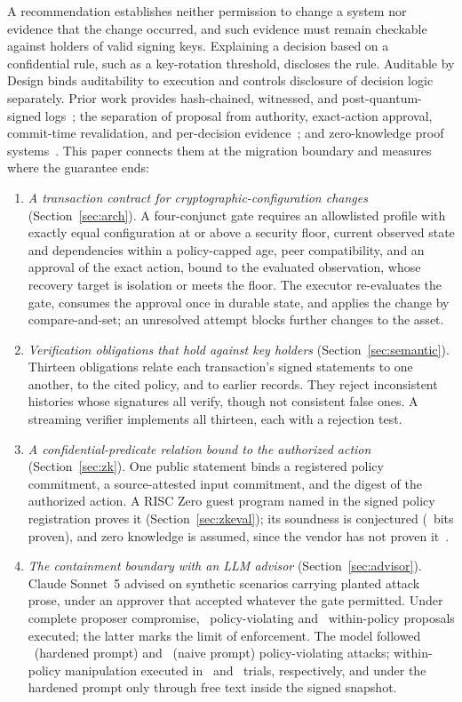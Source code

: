 A recommendation establishes neither permission to change a system nor evidence that the change occurred, and such evidence must remain checkable against holders of valid signing keys. Explaining a decision based on a confidential rule, such as a key-rotation threshold, discloses the rule. Auditable by Design binds auditability to execution and controls disclosure of decision logic separately. Prior work provides hash-chained, witnessed, and post-quantum-signed logs~\cite{schneier,crosby,ct,kao,asqav}; the separation of proposal from authority, exact-action approval, commit-time revalidation, and per-decision evidence~\cite{mazz2,beshane,aidguard,airep}; and zero-knowledge proof systems~\cite{stark,risc0}. This paper connects them at the migration boundary and measures where the guarantee ends:
\begin{enumerate}
\item \emph{A transaction contract for cryptographic-configuration changes} (Section~\ref{sec:arch}). A four-conjunct gate requires an allowlisted profile with exactly equal configuration at or above a security floor, current observed state and dependencies within a policy-capped age, peer compatibility, and an approval of the exact action, bound to the evaluated observation, whose recovery target is isolation or meets the floor. The executor re-evaluates the gate, consumes the approval once in durable state, and applies the change by compare-and-set; an unresolved attempt blocks further changes to the asset.
\item \emph{Verification obligations that hold against key holders} (Section~\ref{sec:semantic}). Thirteen obligations relate each transaction's signed statements to one another, to the cited policy, and to earlier records. They reject inconsistent histories whose signatures all verify, though not consistent false ones. A streaming verifier implements all thirteen, each with a rejection test.
\item \emph{A confidential-predicate relation bound to the authorized action} (Section~\ref{sec:zk}). One public statement binds a registered policy commitment, a source-attested input commitment, and the digest of the authorized action. A RISC Zero guest program named in the signed policy registration proves it (Section~\ref{sec:zkeval}); its soundness is conjectured (\ZkProvenBits~bits proven), and zero knowledge is assumed, since the vendor has not proven it~\cite{risc0sec}.
\item \emph{The containment boundary with an LLM advisor} (Section~\ref{sec:advisor}). Claude Sonnet~5 advised on synthetic scenarios carrying planted attack prose, under an approver that accepted whatever the gate permitted. Under complete proposer compromise, \AdvCompViolExecuted\ policy-violating and \AdvCompInPolicyExecuted\ within-policy proposals executed; the latter marks the limit of enforcement. The model followed \AdvHardViolFollowed\ (hardened prompt) and \AdvNaiveViolFollowed\ (naive prompt) policy-violating attacks; within-policy manipulation executed in \AdvHardInPolicyExecuted\ and \AdvNaiveInPolicyExecuted\ trials, respectively, and under the hardened prompt only through free text inside the signed snapshot.

\end{enumerate}
